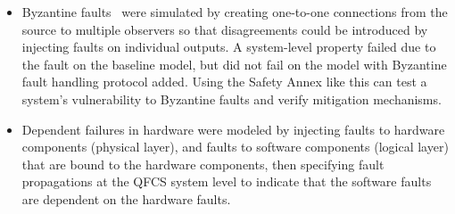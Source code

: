 \begin{itemize} 
	\item Byzantine faults~\cite{Driscoll-Byzantine-Fault} were simulated by creating one-to-one connections from the source to multiple observers so that disagreements could be introduced by injecting faults on individual outputs. A system-level property failed due to the fault on the baseline model, but did not fail on the model with Byzantine fault handling protocol added. Using the Safety Annex like this can test a system's vulnerability to Byzantine faults and verify mitigation mechanisms.
	
	\item Dependent failures in hardware were modeled by injecting faults to hardware components (physical layer), and faults to software components (logical layer) that are bound to the hardware components, then specifying fault propagations at the QFCS system level to indicate that the software faults are dependent on the hardware faults.
\end{itemize}


